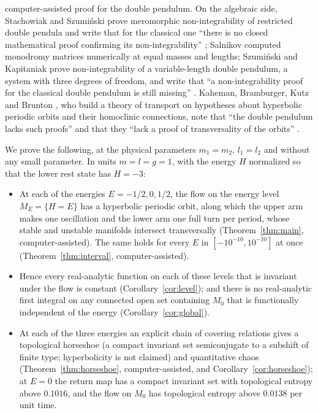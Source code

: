 \documentclass[11pt]{article}
\theoremstyle{definition}
\begin{document}
computer-assisted proof for the double pendulum. On the algebraic side, Stachowiak and Szumi\'nski \cite{ss2015} prove meromorphic non-integrability of restricted double pendula and write that for the classical one ``there is no closed mathematical proof confirming its non-integrability'' \cite[p.~1 of arXiv:1511.01850]{ss2015}; Salnikov \cite{salnikov2013} computed monodromy matrices numerically at equal masses and lengths; Szumi\'nski and Kapitaniak \cite{sk2025} prove non-integrability of a variable-length double pendulum, a system with three degrees of freedom, and write that ``a non-integrability proof for the classical double pendulum is still missing'' \cite[p.~3 of arXiv:2602.21123]{sk2025}. Kaheman, Bramburger, Kutz and Brunton \cite{kbkb2023}, who build a theory of transport on hypotheses about hyperbolic periodic orbits and their homoclinic connections, note that ``the double pendulum lacks such proofs'' and that they ``lack a proof of transversality of the orbits'' \cite[Sect.~5.2, p.~27 of arXiv:2209.10132]{kbkb2023}.

We prove the following, at the physical parameters $m_1 = m_2$, $l_1 = l_2$ and without any small parameter. In units $m = l = g = 1$, with the energy $H$ normalized so that the lower rest state has $H = -3$:

\begin{itemize}
\item At each of the energies $E = -1/2, 0, 1/2$, the flow on the energy level $M_E = \{H = E\}$ has a hyperbolic periodic orbit, along which the upper arm makes one oscillation and the lower arm one full turn per period, whose stable and unstable manifolds intersect transversally (Theorem~\ref{thm:main}, computer-assisted). The same holds for every $E$ in $[-10^{-10}, 10^{-10}]$ at once (Theorem~\ref{thm:interval}, computer-assisted).
\item Hence every real-analytic function on each of these levels that is invariant under the flow is constant (Corollary~\ref{cor:level}); and there is no real-analytic first integral on any connected open set containing $M_0$ that is functionally independent of the energy (Corollary~\ref{cor:global}).
\item At each of the three energies an explicit chain of covering relations gives a topological horseshoe (a compact invariant set semiconjugate to a subshift of finite type; hyperbolicity is not claimed) and quantitative chaos (Theorem~\ref{thm:horseshoe}, computer-assisted, and Corollary~\ref{cor:horseshoe}); at $E = 0$ the return map has a compact invariant set with topological entropy above $0.1016$, and the flow on $M_0$ has topological entropy above $0.0138$ per unit time.
\end{itemize}
\end{document}
